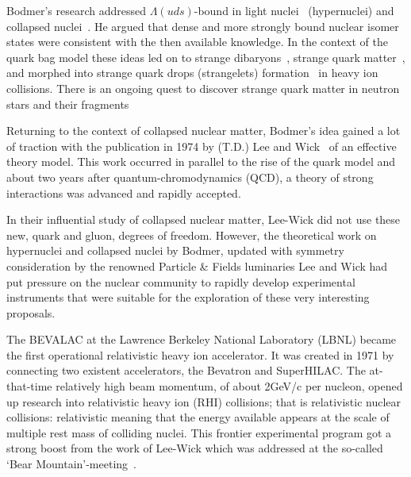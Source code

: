 Bodmer\rq s research addressed $\Lambda(uds)$-bound in light nuclei~\cite{Ali:1967vji} (hypernuclei) and collapsed nuclei~\cite{Bodmer:1971we}. He argued that dense and more strongly bound nuclear isomer states were consistent with the then available knowledge. In the context of the quark bag model these ideas led on to strange dibaryons~\cite{Jaffe:1976yi}, strange quark matter~\cite{Farhi:1984qu,Alford:2006vz}, and morphed into strange quark drops (strangelets) formation~\cite{Greiner:1987tg,Rafelski:1987sf} in heavy ion collisions. There is an ongoing quest to discover strange quark matter in neutron stars and their fragments~\cite{Madsen:1998uh,Weber:2004kj}

Returning to the context of collapsed nuclear matter, Bodmer\rq s idea gained a lot of traction with the publication in 1974 by (T.D.) Lee and Wick~\cite{Lee:1974ma} of an effective theory model. This work occurred in parallel to the rise of the quark model and about two years after quantum-chromodynamics (QCD), a theory of strong interactions was advanced and rapidly accepted.

In their influential study of collapsed nuclear matter, Lee-Wick did not use these new, quark and gluon, degrees of freedom. However, the theoretical work on hypernuclei and collapsed nuclei by Bodmer, updated with symmetry consideration by the renowned Particle \& Fields luminaries Lee and Wick had put pressure on the nuclear community to rapidly develop experimental instruments that were suitable for the exploration of these very interesting proposals. 

The BEVALAC\label{BEVALAC} at the Lawrence Berkeley National Laboratory (LBNL) became the first operational relativistic heavy ion accelerator. It was created in 1971 by connecting two existent accelerators, the Bevatron and SuperHILAC. The at-that-time relatively high beam momentum, of about 2\;GeV/c per nucleon, opened up research into relativistic heavy ion (RHI) collisions; that is relativistic nuclear collisions: relativistic meaning that the energy available appears at the scale of multiple rest mass of colliding nuclei. This frontier experimental program got a strong boost from the work of Lee-Wick which was addressed at the so-called \lq Bear Mountain\rq-meeting~\cite{BearMountain}\label{BearMountain}. \\ 


